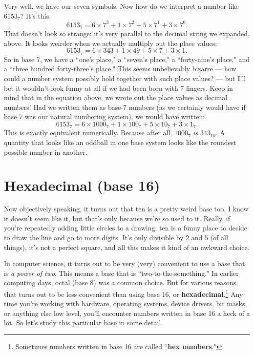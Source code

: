 Very well, we have our seven symbols. Now how do we interpret a number like
$6153_7$? It's this:
\[
6153_{7} = 6 \times 7^3 + 1 \times 7^2 + 5 \times 7^1 + 3 \times 7^0.
\]
That doesn't look so strange: it's very parallel to the decimal string we
expanded, above. It looks weirder when we actually multiply out the place
values:
\[
6153_{7} = 6 \times 343 + 1 \times 49 + 5 \times 7 + 3 \times 1.
\]
So in base 7, we have a ``one's place," a ``seven's place," a
``forty-nine's place," and a ``three hundred forty-three's place." This
seems unbelievably bizarre --- how could a number system possibly hold
together with such place values? --- but I'll bet it wouldn't look funny at
all if we had been born with 7 fingers. Keep in mind that in the equation
above, we wrote out the place values as decimal numbers! Had we written
them as base-7 numbers (as we certainly would have if base 7 was our
natural numbering system), we would have written:
\[
6153_{7} = 6 \times 1000_7 + 1 \times 100_7 + 5 \times 10_7 + 3 \times 1_7.
\]
This is exactly equivalent numerically. Because after all, $1000_7$
\textit{is} $343_{10}$. A quantity that looks like an oddball in one base
system looks like the roundest possible number in another.


\section{Hexadecimal (base 16)}

Now objectively speaking, it turns out that ten is a pretty weird base too.
I know it doesn't seem like it, but that's only because we're so used to
it. Really, if you're repeatedly adding little circles to a drawing, ten is
a funny place to decide to draw the line and go to more digits. It's only
divisible by 2 and 5 (of all things), it's not a perfect square, and all
this makes it kind of an awkward choice.

In computer science, it turns out to be very (very) convenient to use a
base that is \textit{a power of two}. This means a base that is
``two-to-the-something." In earlier computing days, octal (base 8) was a
common choice. But for various reasons, that turns out to be less
convenient than using base 16, or \textbf{hexadecimal}.\footnote{Sometimes
numbers written in base 16 are called ``\textbf{hex numbers}."} Any time
you're working with hardware, operating systems, device drivers, bit masks,
or anything else low level, you'll encounter numbers written in base 16 a
heck of a lot. So let's study this particular base in some detail.

